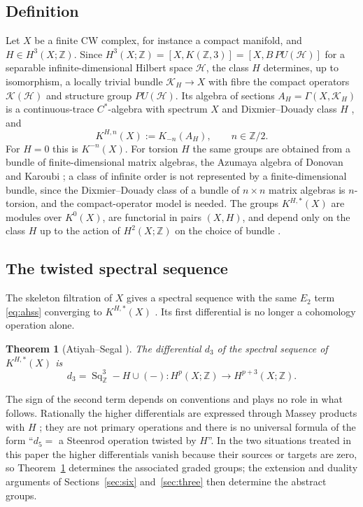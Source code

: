 \documentclass[reqno,11pt]{amsart}
\newtheorem{theorem}{Theorem}[section]
\theoremstyle{definition}
\newcommand{\ZZ}{\mathbb{Z}}
\newcommand{\Sq}{\operatorname{Sq}}
\begin{document}
\subsection{Definition}
Let $X$ be a finite CW complex, for instance a compact manifold, and $H\in H^3(X;\ZZ)$. Since $H^3(X;\ZZ)=[X,K(\ZZ,3)]=[X,B\,PU(\mathcal H)]$ for a separable infinite-dimensional Hilbert space $\mathcal H$, the class $H$ determines, up to isomorphism, a locally trivial bundle $\mathcal K_H\to X$ with fibre the compact operators $\mathcal K(\mathcal H)$ and structure group $PU(\mathcal H)$. Its algebra of sections $A_H=\Gamma(X,\mathcal K_H)$ is a continuous-trace $C^*$-algebra with spectrum $X$ and Dixmier--Douady class $H$ \cite{Ros89}, and
\begin{equation}\label{eq:twistedK}
K^{H,n}(X):=K_{-n}(A_H),\qquad n\in\ZZ/2 .
\end{equation}
For $H=0$ this is $K^{-n}(X)$. For torsion $H$ the same groups are obtained from a bundle of finite-dimensional matrix algebras, the Azumaya algebra of Donovan and Karoubi \cite{DK70}; a class of infinite order is not represented by a finite-dimensional bundle, since the Dixmier--Douady class of a bundle of $n\times n$ matrix algebras is $n$-torsion, and the compact-operator model is needed. The groups $K^{H,*}(X)$ are modules over $K^0(X)$, are functorial in pairs $(X,H)$, and depend only on the class $H$ up to the action of $H^2(X;\ZZ)$ on the choice of bundle \cite{AS04}.

\subsection{The twisted spectral sequence}
The skeleton filtration of $X$ gives a spectral sequence with the same $E_2$ term \eqref{eq:ahss} converging to $K^{H,*}(X)$ \cite{Ros89,AS06}. Its first differential is no longer a cohomology operation alone.

\begin{theorem}[Atiyah--Segal \cite{AS06}]\label{thm:twistedd3}
The differential $d_3$ of the spectral sequence of $K^{H,*}(X)$ is
\[
d_3=\Sq^3_\ZZ-H\cup(-)\colon H^p(X;\ZZ)\longrightarrow H^{p+3}(X;\ZZ).
\]
\end{theorem}

The sign of the second term depends on conventions and plays no role in what follows. Rationally the higher differentials are expressed through Massey products with $H$ \cite{AS06}; they are not primary operations and there is no universal formula of the form ``$d_5=$ a Steenrod operation twisted by $H$''. In the two situations treated in this paper the higher differentials vanish because their sources or targets are zero, so Theorem~\ref{thm:twistedd3} determines the associated graded groups; the extension and duality arguments of Sections~\ref{sec:six} and~\ref{sec:three} then determine the abstract groups.
\end{document}
